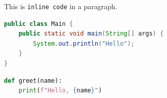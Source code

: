This is \texttt{inline code} in a paragraph.

\begin{lstlisting}[language=java]
public class Main {
    public static void main(String[] args) {
        System.out.println("Hello");
    }
}
\end{lstlisting}

\begin{lstlisting}[language=python]
def greet(name):
    print(f"Hello, {name}")
\end{lstlisting}
